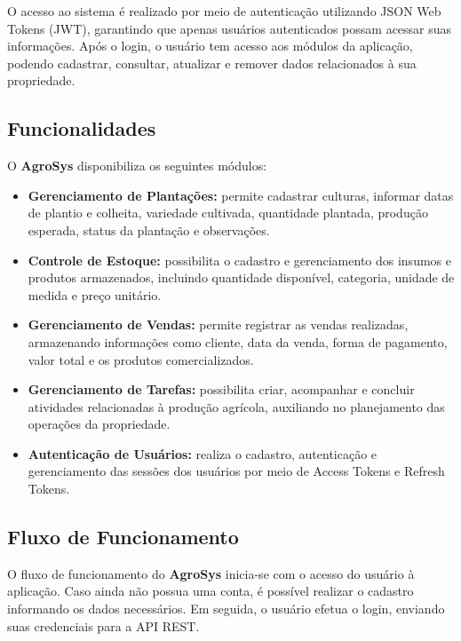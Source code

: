 \documentclass[12pt]{article}
\begin{document}
O acesso ao sistema é realizado por meio de autenticação utilizando JSON Web Tokens (JWT), garantindo que apenas usuários autenticados possam acessar suas informações. Após o login, o usuário tem acesso aos módulos da aplicação, podendo cadastrar, consultar, atualizar e remover dados relacionados à sua propriedade. 

\subsection{Funcionalidades} 
O \textbf{AgroSys} disponibiliza os seguintes módulos: 

\begin{itemize} 
  \item \textbf{Gerenciamento de Plantações:} permite cadastrar culturas, informar datas de plantio e colheita, variedade cultivada, quantidade plantada, produção esperada, status da plantação e observações. 
  
  \item \textbf{Controle de Estoque:} possibilita o cadastro e gerenciamento dos insumos e produtos armazenados, incluindo quantidade disponível, categoria, unidade de medida e preço unitário. 
  
  \item \textbf{Gerenciamento de Vendas:} permite registrar as vendas realizadas, armazenando informações como cliente, data da venda, forma de pagamento, valor total e os produtos comercializados. 
  
  \item \textbf{Gerenciamento de Tarefas:} possibilita criar, acompanhar e concluir atividades relacionadas à produção agrícola, auxiliando no planejamento das operações da propriedade. 
  
  \item \textbf{Autenticação de Usuários:} realiza o cadastro, autenticação e gerenciamento das sessões dos usuários por meio de Access Tokens e Refresh Tokens. 
\end{itemize}

\subsection{Fluxo de Funcionamento}

O fluxo de funcionamento do \textbf{AgroSys} inicia-se com o acesso do usuário à aplicação. Caso ainda não possua uma conta, é possível realizar o cadastro informando os dados necessários. Em seguida, o usuário efetua o login, enviando suas credenciais para a API REST.
\end{document}
